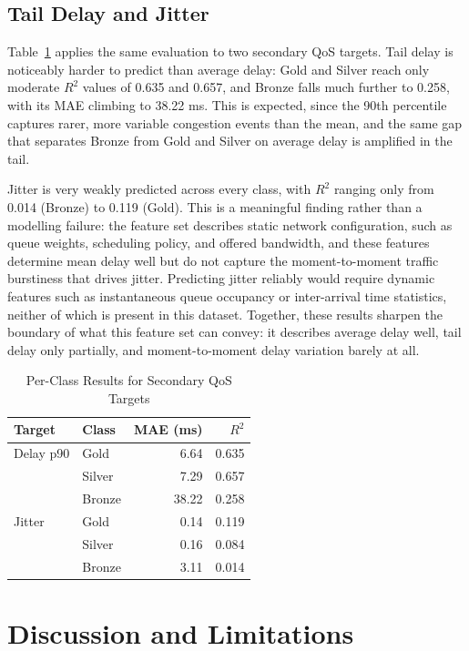 \documentclass[12pt,onecolumn]{IEEEtran}
\begin{document}
\subsection{Tail Delay and Jitter}

Table~\ref{tab:secondary} applies the same evaluation to two secondary QoS targets. Tail delay is noticeably harder to predict than average delay: Gold and Silver reach only moderate $R^2$ values of 0.635 and 0.657, and Bronze falls much further to 0.258, with its MAE climbing to 38.22 ms. This is expected, since the 90th percentile captures rarer, more variable congestion events than the mean, and the same gap that separates Bronze from Gold and Silver on average delay is amplified in the tail.

Jitter is very weakly predicted across every class, with $R^2$ ranging only from 0.014 (Bronze) to 0.119 (Gold). This is a meaningful finding rather than a modelling failure: the feature set describes static network configuration, such as queue weights, scheduling policy, and offered bandwidth, and these features determine mean delay well but do not capture the moment-to-moment traffic burstiness that drives jitter. Predicting jitter reliably would require dynamic features such as instantaneous queue occupancy or inter-arrival time statistics, neither of which is present in this dataset. Together, these results sharpen the boundary of what this feature set can convey: it describes average delay well, tail delay only partially, and moment-to-moment delay variation barely at all.

\begin{table}[t]
\caption{Per-Class Results for Secondary QoS Targets}
\label{tab:secondary}
\centering
\setlength{\tabcolsep}{5pt}
\begin{tabular}{llrr}
\toprule
Target & Class & MAE (ms) & $R^2$ \\
\midrule
Delay p90 & Gold    & 6.64  & 0.635 \\
          & Silver  & 7.29  & 0.657 \\
          & Bronze  & 38.22 & 0.258 \\
\midrule
Jitter    & Gold    & 0.14 & 0.119 \\
          & Silver  & 0.16 & 0.084 \\
          & Bronze  & 3.11 & 0.014 \\
\bottomrule
\end{tabular}
\end{table}

\section{Discussion and Limitations}
\end{document}
